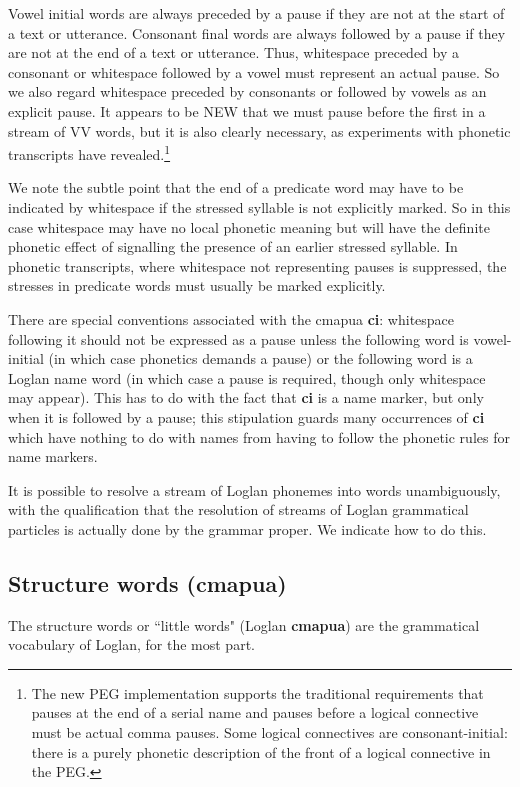 \documentclass[12pt]{book}
\begin{document}
Vowel initial words are always preceded by a pause if they are not at the start of a text or utterance.  Consonant final words are always followed by a pause if they are not at the end of a text or utterance.  Thus, whitespace preceded by a consonant or whitespace followed by a vowel must represent an actual pause.  So we also regard whitespace preceded by consonants or followed by vowels
as an explicit pause.  It appears to be NEW that we must pause before the first in a stream of VV words, but it is also clearly necessary, as experiments with phonetic transcripts have revealed.\footnote{The new PEG implementation supports the traditional requirements
that pauses at the end of a serial name and pauses before a logical connective must be actual comma pauses.  Some logical connectives are consonant-initial:  there is a purely phonetic description of the front of a logical connective in the PEG.}

We note the subtle point that the end of a predicate word may have to be indicated by whitespace if the stressed syllable is not explicitly marked.  So in this case whitespace may have no local phonetic meaning but will have the definite phonetic effect of signalling the presence of an earlier stressed syllable.  In phonetic transcripts, where whitespace not representing  pauses is suppressed, the stresses in predicate words must usually be marked explicitly.

There are special conventions associated with the cmapua {\bf ci}:  whitespace following it should not be expressed as a pause unless the following word is vowel-initial (in which case phonetics demands a pause) or the following word is a Loglan name word (in which case a pause is required, though only whitespace may appear).  This has to do with the fact that {\bf ci} is a name marker, but only when it is followed by a pause; this stipulation guards many occurrences of {\bf ci} which have nothing to do with names from having to follow the phonetic rules for name markers.

It is possible to resolve a stream of Loglan phonemes into words unambiguously, with the qualification that the resolution of streams of Loglan grammatical particles is actually done by the grammar proper.  We indicate how to do this.

\subsection{Structure words (cmapua)}

The structure words or ``little words" (Loglan {\bf cmapua}) are the grammatical vocabulary of Loglan, for the most part.
\end{document}

